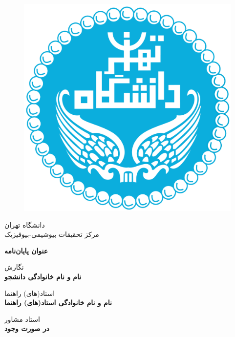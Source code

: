 \documentclass[12pt]{report}
\begin{document}
\thispagestyle{empty}

\thispagestyle{empty}
\begin{figure}
\centering
\includegraphics[scale=0.1]{UT-Logo.png}
\end{figure}

\begin{center}
{\small دانشگاه تهران
\\
مرکز تحقیقات بیوشیمی-بیوفیزیک}
\end{center}

\vfill

\begin{center}

\LARGE{\textbf{عنوان پایان‌نامه }}
\end{center}
\vfill
\begin{center}
نگارش\\
{\large
\textbf{نام و نام خانوادگی دانشجو}}
\end{center}
\begin{center}
استاد(های) راهنما \\

{\large \textbf{نام و نام خانوادگی استاد(های) راهنما}}
\end{center}
\begin{center}
استاد مشاور \\

{\large \textbf{در صورت وجود}}
\end{center}
\end{document}
